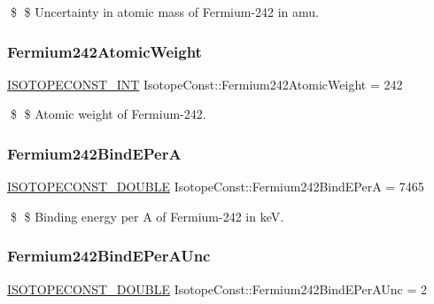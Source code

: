 \$ \$ Uncertainty in atomic mass of Fermium-\/242 in amu. \mbox{\label{group___isotope_const-_fermium-_fm242_ga52fb0e3a03be7472bad61032c9354725}} 
\subsubsection{\texorpdfstring{Fermium242\+Atomic\+Weight}{Fermium242AtomicWeight}}
{\footnotesize\ttfamily \mbox{\hyperlink{group___isotope_const-_macros_ga5f18360b3e99483a35c32d789e62621c}{I\+S\+O\+T\+O\+P\+E\+C\+O\+N\+S\+T\+\_\+\+I\+NT}} Isotope\+Const\+::\+Fermium242\+Atomic\+Weight = 242}

\$ \$ Atomic weight of Fermium-\/242. \mbox{\label{group___isotope_const-_fermium-_fm242_gabc08743c9784c466c9f127fc03195865}} 
\subsubsection{\texorpdfstring{Fermium242\+Bind\+E\+PerA}{Fermium242BindEPerA}}
{\footnotesize\ttfamily \mbox{\hyperlink{group___isotope_const-_macros_ga8f45a7272ce02c0b4c65c44636ed719a}{I\+S\+O\+T\+O\+P\+E\+C\+O\+N\+S\+T\+\_\+\+D\+O\+U\+B\+LE}} Isotope\+Const\+::\+Fermium242\+Bind\+E\+PerA = 7465}

\$ \$ Binding energy per A of Fermium-\/242 in keV. \mbox{\label{group___isotope_const-_fermium-_fm242_gaead7cfbc40007c559adcbf7bde6691c1}} 
\subsubsection{\texorpdfstring{Fermium242\+Bind\+E\+Per\+A\+Unc}{Fermium242BindEPerAUnc}}
{\footnotesize\ttfamily \mbox{\hyperlink{group___isotope_const-_macros_ga8f45a7272ce02c0b4c65c44636ed719a}{I\+S\+O\+T\+O\+P\+E\+C\+O\+N\+S\+T\+\_\+\+D\+O\+U\+B\+LE}} Isotope\+Const\+::\+Fermium242\+Bind\+E\+Per\+A\+Unc = 2}

